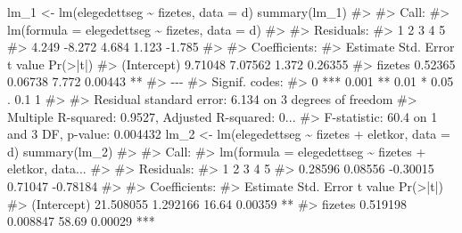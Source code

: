 \documentclass[
  letterpaper,
]{krantz}
\makeatletter
\newenvironment{Shaded}{\begin{snugshade}}{\end{snugshade}}
\newcommand{\AttributeTok}[1]{\textcolor[rgb]{0.40,0.45,0.13}{#1}}
\newcommand{\CommentTok}[1]{\textcolor[rgb]{0.37,0.37,0.37}{#1}}
\newcommand{\FunctionTok}[1]{\textcolor[rgb]{0.28,0.35,0.67}{#1}}
\newcommand{\NormalTok}[1]{\textcolor[rgb]{0.00,0.23,0.31}{#1}}
\newcommand{\OtherTok}[1]{\textcolor[rgb]{0.00,0.23,0.31}{#1}}
\newcommand{\SpecialCharTok}[1]{\textcolor[rgb]{0.37,0.37,0.37}{#1}}
\newenvironment{kframe}{%
\medskip{}
\setlength{\fboxsep}{.8em}
 \def\at@end@of@kframe{}%
 \ifinner\ifhmode%
  \def\at@end@of@kframe{\end{minipage}}%
  \begin{minipage}{\columnwidth}%
 \fi\fi%
 \def\FrameCommand##1{\hskip\@totalleftmargin \hskip-\fboxsep
 \colorbox{shadecolor}{##1}\hskip-\fboxsep
     \hskip-\linewidth \hskip-\@totalleftmargin \hskip\columnwidth}%
 \MakeFramed {\advance\hsize-\width
   \@totalleftmargin\z@ \linewidth\hsize
   \@setminipage}}%
 {\par\unskip\endMakeFramed%
 \at@end@of@kframe}
\renewenvironment{Shaded}{\begin{kframe}}{\end{kframe}}
\makeatother
\begin{document}
\begin{Shaded}
\begin{Highlighting}[]
\NormalTok{lm\_1 }\OtherTok{\textless{}{-}} \FunctionTok{lm}\NormalTok{(elegedettseg }\SpecialCharTok{\textasciitilde{}}\NormalTok{ fizetes, }\AttributeTok{data =}\NormalTok{ d)}
\FunctionTok{summary}\NormalTok{(lm\_1)}
\CommentTok{\#\textgreater{} }
\CommentTok{\#\textgreater{} Call:}
\CommentTok{\#\textgreater{} lm(formula = elegedettseg \textasciitilde{} fizetes, data = d)}
\CommentTok{\#\textgreater{} }
\CommentTok{\#\textgreater{} Residuals:}
\CommentTok{\#\textgreater{}      1      2      3      4      5 }
\CommentTok{\#\textgreater{}  4.249 {-}8.272  4.684  1.123 {-}1.785 }
\CommentTok{\#\textgreater{} }
\CommentTok{\#\textgreater{} Coefficients:}
\CommentTok{\#\textgreater{}             Estimate Std. Error t value Pr(\textgreater{}|t|)   }
\CommentTok{\#\textgreater{} (Intercept)  9.71048    7.07562   1.372  0.26355   }
\CommentTok{\#\textgreater{} fizetes      0.52365    0.06738   7.772  0.00443 **}
\CommentTok{\#\textgreater{} {-}{-}{-}}
\CommentTok{\#\textgreater{} Signif. codes:  }
\CommentTok{\#\textgreater{} 0 \textquotesingle{}***\textquotesingle{} 0.001 \textquotesingle{}**\textquotesingle{} 0.01 \textquotesingle{}*\textquotesingle{} 0.05 \textquotesingle{}.\textquotesingle{} 0.1 \textquotesingle{} \textquotesingle{} 1}
\CommentTok{\#\textgreater{} }
\CommentTok{\#\textgreater{} Residual standard error: 6.134 on 3 degrees of freedom}
\CommentTok{\#\textgreater{} Multiple R{-}squared:  0.9527, Adjusted R{-}squared:  0...}
\CommentTok{\#\textgreater{} F{-}statistic:  60.4 on 1 and 3 DF,  p{-}value: 0.004432}
\NormalTok{lm\_2 }\OtherTok{\textless{}{-}} \FunctionTok{lm}\NormalTok{(elegedettseg }\SpecialCharTok{\textasciitilde{}}\NormalTok{ fizetes }\SpecialCharTok{+}\NormalTok{ eletkor, }\AttributeTok{data =}\NormalTok{ d)}
\FunctionTok{summary}\NormalTok{(lm\_2)}
\CommentTok{\#\textgreater{} }
\CommentTok{\#\textgreater{} Call:}
\CommentTok{\#\textgreater{} lm(formula = elegedettseg \textasciitilde{} fizetes + eletkor, data...}
\CommentTok{\#\textgreater{} }
\CommentTok{\#\textgreater{} Residuals:}
\CommentTok{\#\textgreater{}        1        2        3        4        5 }
\CommentTok{\#\textgreater{}  0.28596  0.08556 {-}0.30015  0.71047 {-}0.78184 }
\CommentTok{\#\textgreater{} }
\CommentTok{\#\textgreater{} Coefficients:}
\CommentTok{\#\textgreater{}              Estimate Std. Error t value Pr(\textgreater{}|t|)    }
\CommentTok{\#\textgreater{} (Intercept) 21.508055   1.292166   16.64  0.00359 ** }
\CommentTok{\#\textgreater{} fizetes      0.519198   0.008847   58.69  0.00029 ***}

\end{Highlighting}
\end{Shaded}
\end{document}
